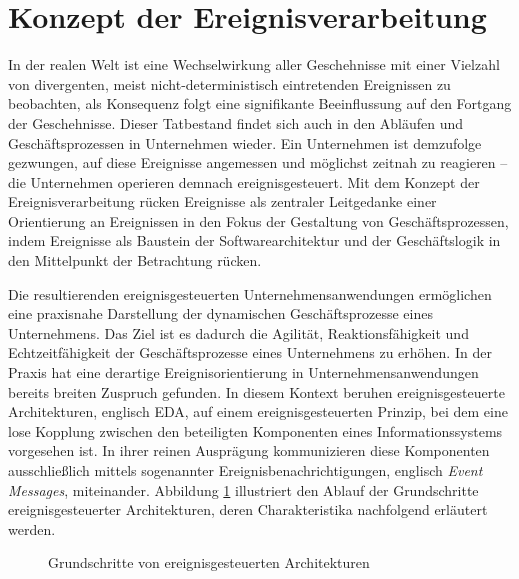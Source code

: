 \section{Konzept der Ereignisverarbeitung}\label{sec:Ereignisverarbeitung}
In der realen Welt ist eine Wechselwirkung aller Geschehnisse mit einer Vielzahl von divergenten, meist nicht-deterministisch eintretenden Ereignissen zu beobachten, als Konsequenz folgt eine signifikante Beeinflussung auf den Fortgang der Geschehnisse.
\cite{Grauer.2010}
Dieser Tatbestand findet sich auch in den Abläufen und Geschäftsprozessen in Unternehmen wieder.
Ein Unternehmen ist demzufolge gezwungen, auf diese Ereignisse angemessen und möglichst zeitnah zu reagieren – die Unternehmen operieren demnach ereignisgesteuert. 
\cite{Schaaf.2015}
Mit dem Konzept der Ereignisverarbeitung rücken Ereignisse als zentraler Leitgedanke einer Orientierung an Ereignissen in den Fokus der Gestaltung von Geschäftsprozessen, indem Ereignisse als Baustein der Softwarearchitektur und der Geschäftslogik in den Mittelpunkt der Betrachtung rücken. 
\cite{Bruns.2010}

Die resultierenden ereignisgesteuerten Unternehmensanwendungen ermöglichen eine praxisnahe Darstellung der dynamischen Geschäftsprozesse eines Unternehmens. 
Das Ziel ist es dadurch die Agilität, Reaktionsfähigkeit und Echtzeitfähigkeit der Geschäftsprozesse eines Unternehmens zu erhöhen. 
In der Praxis hat eine derartige Ereignisorientierung in Unternehmensanwendungen bereits breiten Zuspruch gefunden. 
\cite{Bruns.2015}
In diesem Kontext beruhen ereignisgesteuerte Architekturen, englisch \ac{EDA}, auf einem ereignisgesteuerten Prinzip, bei dem eine lose Kopplung zwischen den beteiligten Komponenten eines Informationssystems vorgesehen ist.  
In ihrer reinen Ausprägung kommunizieren diese Komponenten ausschließlich mittels sogenannter Ereignisbenachrichtigungen, englisch \textit{Event Messages}, miteinander.
Abbildung \ref{fig:Grundschritte von ereignisgesteuerten Architekturen} illustriert den Ablauf der Grundschritte ereignisgesteuerter Architekturen, deren Charakteristika nachfolgend erläutert werden.
\cite{Schaaf.2015}

\begin{figure}[H]
	\centering 
    \caption[Grundschritte von ereignisgesteuerten Architekturen]
    {Grundschritte von ereignisgesteuerten Architekturen \protect\footnotemark}
    \label{fig:Grundschritte von ereignisgesteuerten Architekturen}
\end{figure}


